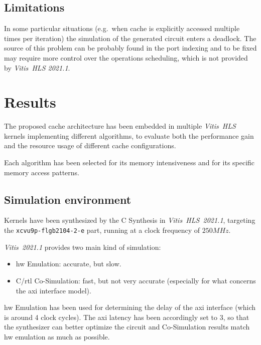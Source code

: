 \documentclass[11pt,a4paper,oneside]{memoir}
\begin{document}
\section{Limitations}
In some particular situations (e.g.\ when cache is explicitly accessed multiple
times per iteration) the simulation of the generated circuit enters a deadlock.
The source of this problem can be probably found in the port indexing and to be
fixed may require more control over the operations scheduling, which is not
provided by \emph{Vitis\texttrademark~HLS 2021.1}.

\chapter{Results}
The proposed cache architecture has been embedded in multiple \emph{Vitis~HLS}
kernels implementing different algorithms, to evaluate both the performance gain
and the resource usage of different cache configurations.

Each algorithm has been selected for its memory intensiveness and for its
specific memory access patterns.

\section{Simulation environment}
Kernels have been synthesized by the C Synthesis in
\emph{Vitis\texttrademark~HLS~2021.1}, targeting the
\texttt{xcvu9p-flgb2104-2-e} part, running at a clock frequency of $250 MHz$.

\emph{Vitis\texttrademark~2021.1} provides two main kind of simulation:
\begin{itemize}
	\item \acl{hw} Emulation: accurate, but slow.
	\item C/\acs{rtl} Co-Simulation: fast, but not very accurate
		(especially for what concerns the \ac{axi} interface model).
\end{itemize}

\ac{hw} Emulation has been used for determining the delay of the \ac{axi}
interface (which is around 4 clock cycles). 
The \ac{axi} latency has been accordingly set to 3, so that the synthesizer can
better optimize the circuit and Co-Simulation results match \ac{hw} emulation as
much as possible.
\end{document}
